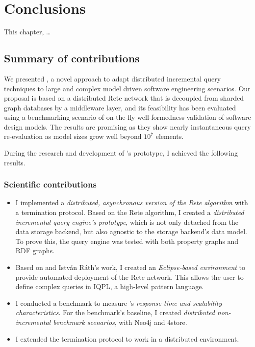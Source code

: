 \chapter{Conclusions}
\label{chap:conclusions}

This chapter, \ldots

\section{Summary of contributions}

We presented \iqd{}, a novel approach to adapt distributed incremental query techniques to large and complex model driven software engineering scenarios. Our proposal is based on a distributed Rete network that is decoupled from sharded graph databases by a middleware layer, and its feasibility has been evaluated using a benchmarking scenario of on-the-fly well-formedness validation of software design models. The results are promising as they show nearly instantaneous query re-evaluation as model sizes grow well beyond $10^7$ elements.


During the research and development of \iqd{}'s prototype, I achieved the following results.

\subsection{Scientific contributions}

\begin{itemize}
  \item I implemented a \emph{distributed, asynchronous version of the Rete algorithm} with a termination protocol. Based on the Rete algorithm, I created a \emph{distributed incremental query engine's prototype}, which is not only detached from the data storage backend, but also agnostic to the storage backend's data model. To prove this, the query engine was tested with both property graphs and RDF graphs. 
  \item Based on \eiq{} and István Ráth's work, I created an \emph{Eclipse-based environment} to provide automated deployment of the Rete network. This allows the user to define complex queries in IQPL, a high-level pattern language. %
  \item I conducted a benchmark to measure \iqd{}'s \emph{response time and scalability characteristics}. For the benchmark's baseline, I created \emph{distributed non-incremental benchmark scenarios}, with Neo4j and 4store.
  \item I extended the termination protocol to work in a distributed environment. 
\end{itemize}


